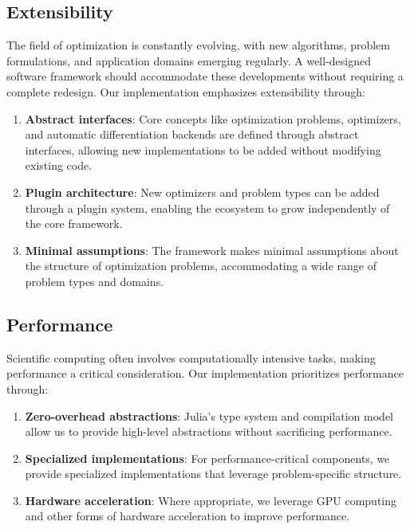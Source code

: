 \subsection{Extensibility}

The field of optimization is constantly evolving, with new algorithms, problem formulations, and application domains emerging regularly. A well-designed software framework should accommodate these developments without requiring a complete redesign. Our implementation emphasizes extensibility through:

\begin{enumerate}
\item \textbf{Abstract interfaces}: Core concepts like optimization problems, optimizers, and automatic differentiation backends are defined through abstract interfaces, allowing new implementations to be added without modifying existing code.

\item \textbf{Plugin architecture}: New optimizers and problem types can be added through a plugin system, enabling the ecosystem to grow independently of the core framework.

\item \textbf{Minimal assumptions}: The framework makes minimal assumptions about the structure of optimization problems, accommodating a wide range of problem types and domains.
\end{enumerate}

\subsection{Performance}

Scientific computing often involves computationally intensive tasks, making performance a critical consideration. Our implementation prioritizes performance through:

\begin{enumerate}
\item \textbf{Zero-overhead abstractions}: Julia's type system and compilation model allow us to provide high-level abstractions without sacrificing performance.

\item \textbf{Specialized implementations}: For performance-critical components, we provide specialized implementations that leverage problem-specific structure.

\item \textbf{Hardware acceleration}: Where appropriate, we leverage GPU computing and other forms of hardware acceleration to improve performance.
\end{enumerate}

